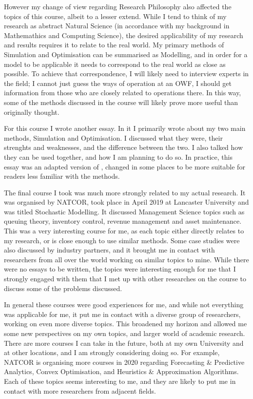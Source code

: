 \documentclass[a4paper,12pt]{article}
\begin{document}
However my change of view regarding Research Philosophy also affected the topics of this course, albeit to a lesser extend. While I tend to think of my research as abstract Natural Science (in accordance with my background in Mathemathics and Computing Science), the desired applicability of my research and results requires it to relate to the real world. My primary methods of Simulation and Optimisation can be summarised as Modelling, and in order for a model to be applicable it needs to correspond to the real world as close as possible. To achieve that correspondence, I will likely need to interview experts in the field; I cannot just guess the ways of operation at an OWF, I should get information from those who are closely related to operations there. In this way, some of the methods discussed in the course will likely prove more useful than originally thought. 

For this course I wrote another essay. In it I primarily wrote about my two main methods, Simulation and Optimisation. I discussed what they were, their strenghts and weaknesses, and the difference between the two. I also talked how they can be used together, and how I am planning to do so. In practice, this essay was an adapted version of , changed in some places to be more suitable for readers less familiar with the methods. 

\bigskip

The final course I took was much more strongly related to my actual research. It was organised by NATCOR, took place in April 2019 at Lancaster University and was titled Stochastic Modelling. It discussed Management Science topics such as queuing theory, inventory control, revenue management and asset maintenance. This was a very interesting course for me, as each topic either directly relates to my research, or is close enough to use similar methods. Some case studies were also discussed by industry partners, and it brought me in contact with researchers from all over the world working on similar topics to mine. While there were no essays to be written, the topics were interesting enough for me that I strongly engaged with them that I met up with other researches on the course to discuss some of the problems discussed. 

\bigskip

In general these courses were good experiences for me, and while not everything was applicable for me, it put me in contact with a diverse group of researchers, working on even more diverse topics. This broadened my horizon and allowed me some new perspectives on my own topics, and larger world of academic research. There are more courses I can take in the future, both at my own University and at other locations, and I am strongly considering doing so. For example, NATCOR is organising more courses in 2020 regarding Forecasting \& Predictive Analytics, Convex Optimisation, and Heuristics \& Approximation Algorithms. Each of these topics seems interesting to me, and they are likely to put me in contact with more researchers from adjacent fields. 
\end{document}
